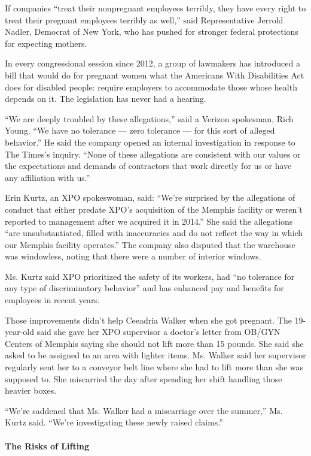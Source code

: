 If companies ``treat their nonpregnant employees terribly, they have
every right to treat their pregnant employees terribly as well,'' said
Representative Jerrold Nadler, Democrat of New York, who has pushed for
stronger federal protections for expecting mothers.

In every congressional session since 2012, a group of lawmakers has
introduced a bill that would do for pregnant women what the Americans
With Disabilities Act does for disabled people: require employers to
accommodate those whose health depends on it. The legislation has never
had a hearing.

``We are deeply troubled by these allegations,'' said a Verizon
spokesman, Rich Young. ``We have no tolerance --- zero tolerance --- for
this sort of alleged behavior.'' He said the company opened an internal
investigation in response to The Times's inquiry. ``None of these
allegations are consistent with our values or the expectations and
demands of contractors that work directly for us or have any affiliation
with us.''

Erin Kurtz, an XPO spokeswoman, said: ``We're surprised by the
allegations of conduct that either predate XPO's acquisition of the
Memphis facility or weren't reported to management after we acquired it
in 2014.'' She said the allegations ``are unsubstantiated, filled with
inaccuracies and do not reflect the way in which our Memphis facility
operates.'' The company also disputed that the warehouse was windowless,
noting that there were a number of interior windows.

Ms. Kurtz said XPO prioritized the safety of its workers, had ``no
tolerance for any type of discriminatory behavior'' and has enhanced pay
and benefits for employees in recent years.

Those improvements didn't help Ceeadria Walker when she got pregnant.
The 19-year-old said she gave her XPO supervisor a doctor's letter from
OB/GYN Centers of Memphis saying she should not lift more than 15
pounds. She said she asked to be assigned to an area with lighter items.
Ms. Walker said her supervisor regularly sent her to a conveyor belt
line where she had to lift more than she was supposed to. She miscarried
the day after spending her shift handling those heavier boxes.

``We're saddened that Ms. Walker had a miscarriage over the summer,''
Ms. Kurtz said. ``We're investigating these newly raised claims.''

\hypertarget{the-risks-of-lifting}{%
\paragraph{The Risks of Lifting}\label{the-risks-of-lifting}}

